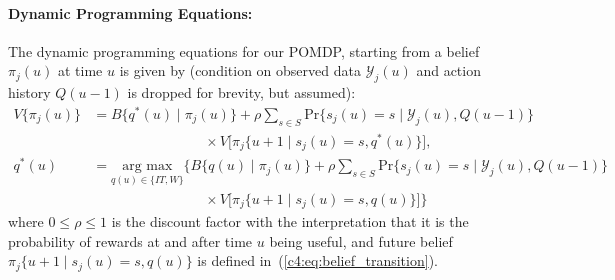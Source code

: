 \begin{subappendices}
\paragraph{\textbf{Dynamic Programming Equations}:}
The dynamic programming equations for our POMDP, starting from a belief $\pi_j (u)$ at time $u$ is given by (condition on observed data $\mathcal{Y}_j(u)$ and action history $Q(u-1)$ is dropped for brevity, but assumed):
\begin{equation*}
\begin{split}
    V\big\{\pi_j(u)\big\} &= B\big\{q^*(u) \mid \pi_j(u) \big\} + \rho \sum_{s \in S} \mbox{Pr}\big\{s_j(u) = s \mid \mathcal{Y}_j(u), Q(u-1)\big\}\\
    & \quad \quad\quad\quad\quad\quad \quad \quad \times V\big[\pi_j\{u+1 \mid s_j(u)=s, q^*(u)\}\big],\\
     q^*(u) &= \underset{q(u) \in \{IT,W\}}{\mbox{arg max}} \Big\{B\big\{q(u) \mid \pi_j(u) \big\} + \rho \sum_{s \in S} \mbox{Pr}\big\{s_j(u) = s \mid \mathcal{Y}_j(u), Q(u-1)\big\}\\
    & \quad \quad\quad\quad\quad\quad \quad \quad \times V\big[\pi_j\{u+1 \mid s_j(u)=s, q(u)\}\big]\Big\}
\end{split}
\end{equation*}
where $0 \leq \rho \leq 1$ is the discount factor with the interpretation that it is the probability of rewards at and after time $u$ being useful, and future belief $\pi_j\{u+1 \mid s_j(u)=s, q(u)\}$ is defined in~(\ref{c4:eq:belief_transition}).


\end{subappendices}
